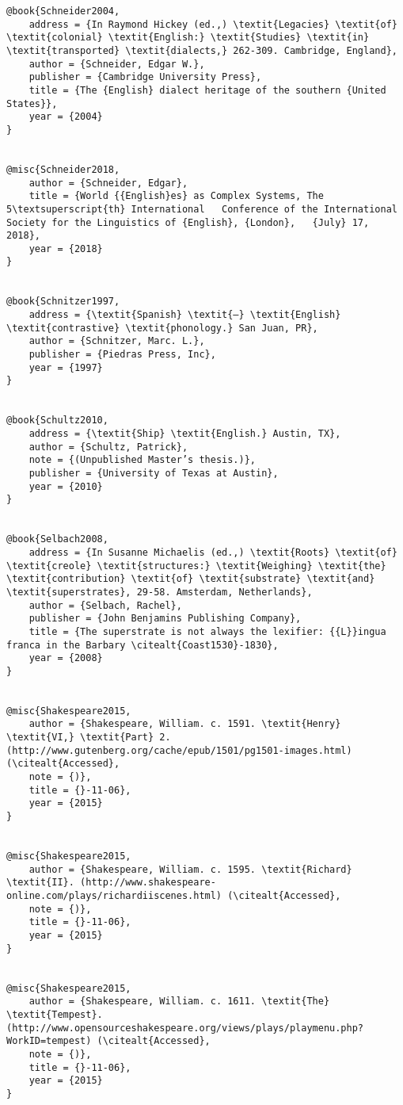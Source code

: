 \begin{verbatim}
@book{Schneider2004,
	address = {In Raymond Hickey (ed.,) \textit{Legacies} \textit{of} \textit{colonial} \textit{English:} \textit{Studies} \textit{in} \textit{transported} \textit{dialects,} 262-309. Cambridge, England},
	author = {Schneider, Edgar W.},
	publisher = {Cambridge University Press},
	title = {The {English} dialect heritage of the southern {United States}},
	year = {2004}
}


@misc{Schneider2018,
	author = {Schneider, Edgar},
	title = {World {{English}es} as Complex Systems, The 5\textsuperscript{th} International   Conference of the International Society for the Linguistics of {English}, {London},   {July} 17, 2018},
	year = {2018}
}


@book{Schnitzer1997,
	address = {\textit{Spanish} \textit{–} \textit{English} \textit{contrastive} \textit{phonology.} San Juan, PR},
	author = {Schnitzer, Marc. L.},
	publisher = {Piedras Press, Inc},
	year = {1997}
}


@book{Schultz2010,
	address = {\textit{Ship} \textit{English.} Austin, TX},
	author = {Schultz, Patrick},
	note = {(Unpublished Master’s thesis.)},
	publisher = {University of Texas at Austin},
	year = {2010}
}


@book{Selbach2008,
	address = {In Susanne Michaelis (ed.,) \textit{Roots} \textit{of} \textit{creole} \textit{structures:} \textit{Weighing} \textit{the} \textit{contribution} \textit{of} \textit{substrate} \textit{and} \textit{superstrates}, 29-58. Amsterdam, Netherlands},
	author = {Selbach, Rachel},
	publisher = {John Benjamins Publishing Company},
	title = {The superstrate is not always the lexifier: {{L}}ingua franca in the Barbary \citealt{Coast1530}-1830},
	year = {2008}
}


@misc{Shakespeare2015,
	author = {Shakespeare, William. c. 1591. \textit{Henry} \textit{VI,} \textit{Part} 2. (http://www.gutenberg.org/cache/epub/1501/pg1501-images.html) (\citealt{Accessed},
	note = {)},
	title = {}-11-06},
	year = {2015}
}


@misc{Shakespeare2015,
	author = {Shakespeare, William. c. 1595. \textit{Richard} \textit{II}. (http://www.shakespeare-online.com/plays/richardiiscenes.html) (\citealt{Accessed},
	note = {)},
	title = {}-11-06},
	year = {2015}
}


@misc{Shakespeare2015,
	author = {Shakespeare, William. c. 1611. \textit{The} \textit{Tempest}. (http://www.opensourceshakespeare.org/views/plays/playmenu.php?WorkID=tempest) (\citealt{Accessed},
	note = {)},
	title = {}-11-06},
	year = {2015}
}



\end{verbatim}
